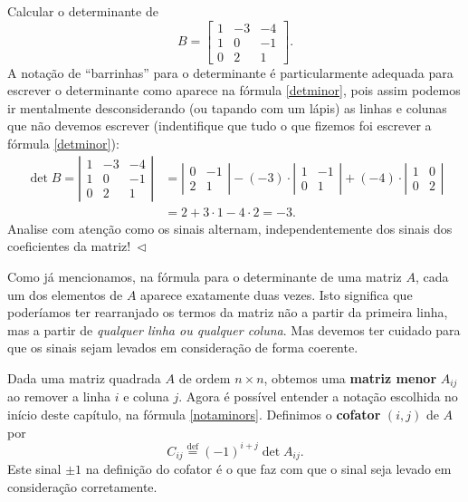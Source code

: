 \begin{ex}
	Calcular o determinante de
	\begin{equation}
	B = \begin{bmatrix}
	1 & -3 & -4  \\
	1 & 0 & -1 \\
	0 & 2 & 1
	\end{bmatrix}.
	\end{equation} A notação de ``barrinhas'' para o determinante é particularmente adequada para escrever o determinante como aparece na fórmula \eqref{detminor}, pois assim podemos ir mentalmente desconsiderando (ou tapando com um lápis) as linhas e colunas que não devemos escrever (indentifique que tudo o que fizemos foi escrever a fórmula \eqref{detminor}):
        \begin{equation}
	\begin{split}
	\det B = \left| \begin{matrix}
	1 & -3 & -4  \\
    1 & 0  & -1  \\
    0 & 2  & 1
	\end{matrix} \right| & = \left| \begin{matrix}
	0 & -1 \\
	2 & 1
	\end{matrix} \right| - (-3) \cdot \left| \begin{matrix}
	1 &  -1 \\
	0 &  1
	\end{matrix} \right| + (-4) \cdot \left| \begin{matrix}
	1 & 0  \\
	0 & 2
	\end{matrix} \right| \\ & = 2 + 3 \cdot 1  -4 \cdot 2 = -3.
	\end{split}
      \end{equation}
 Analise com atenção como os sinais alternam, independentemente dos sinais dos coeficientes da matriz!$ \ \lhd$
\end{ex}


Como já mencionamos, na fórmula para o determinante de uma matriz $A$, cada um dos elementos de $A$ aparece exatamente duas vezes. Isto significa que poderíamos ter rearranjado os termos da matriz não a partir da primeira linha, mas a partir de \textit{qualquer linha ou qualquer coluna}. Mas devemos ter cuidado para que os sinais sejam levados em consideração de forma coerente.

Dada uma matriz quadrada $A$ de ordem $n \times n$, obtemos uma \textbf{matriz menor} $A_{ij}$ ao remover a linha $i$ e coluna $j$. Agora é possível entender a notação escolhida no início deste capítulo, na fórmula \eqref{notaminors}. Definimos o \textbf{cofator} $(i,j)$ de $A$ por
\begin{equation}
C_{ij} \stackrel{\text{def}}{=} (-1)^{i + j} \det A_{ij}.
\end{equation} Este sinal $\pm 1$ na definição do cofator é o que faz com que o sinal seja levado em consideração corretamente.

